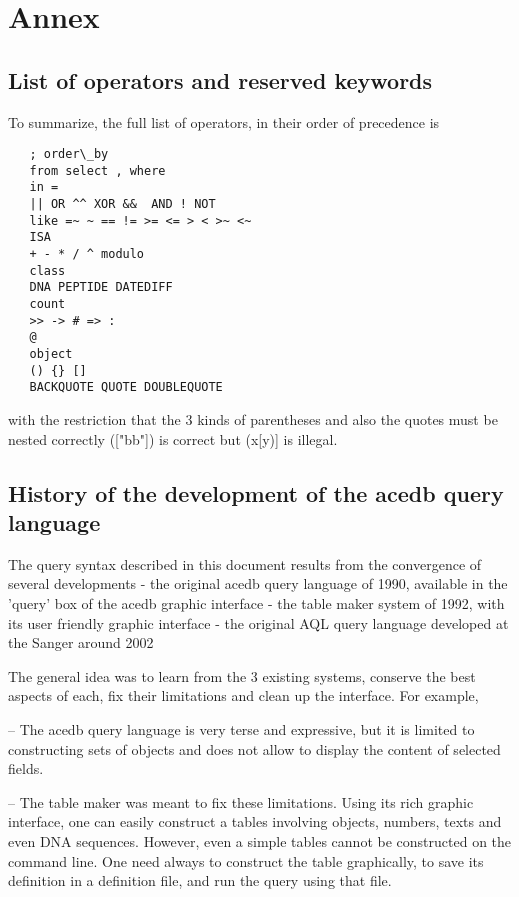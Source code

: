 \documentclass[11pt]{article}
\newcommand{\BL}{\begin{lstlisting}}
\begin{document}
%%%%%%%%%%%%%%%%%%%%%%%%%%%%%%%%%%%%%%%%%%%%%%%%%%%%%%%%%%%%%%%%
% SECTION
%%%%%%%%%%%%%%%%%%%%%%%%%%%%%%%%%%%%%%%%%%%%%%%%%%%%%%%%%%%%%%%%
\appendix
\section {Annex}
%%%%%%%%%%%%%%%%%%%%%%%%%%%%%%%%%%%%%%%%%%%%%%%%%%%%%%%%%%%%%%%%
% SECTION
%%%%%%%%%%%%%%%%%%%%%%%%%%%%%%%%%%%%%%%%%%%%%%%%%%%%%%%%%%%%%%%%
\subsection{List of operators and reserved keywords}

To summarize, the full list of operators, in their order of precedence is
\BL
   ; order\_by
   from select , where
   in = 
   || OR ^^ XOR &&  AND ! NOT
   like =~ ~ == != >= <= > < >~ <~
   ISA
   + - * / ^ modulo
   class
   DNA PEPTIDE DATEDIFF 
   count
   >> -> # => :
   @
   object
   () {} []
   BACKQUOTE QUOTE DOUBLEQUOTE 
\end{lstlisting}

with the restriction that the 3 kinds of parentheses and 
also the quotes must be nested correctly  (["bb"]) is correct but (x[y)] is illegal.

\subsection{History of the development of the acedb query language}

The query syntax described in this document results from the convergence of several developments
   - the original acedb query language of 1990, available in the 'query' box of the acedb graphic interface
   - the table maker system of 1992, with its user friendly graphic interface 
   - the original AQL query language developed at the Sanger around 2002

The general idea was to learn from the 3 existing systems, conserve the best aspects of each, fix their limitations and clean up the interface. For example, 

-- The acedb query language is very terse and expressive, but it is limited to constructing sets of objects and does not allow to display the content of selected fields.

-- The table maker was meant to fix these limitations. Using its rich graphic interface, one can easily construct a tables involving objects, numbers, texts and even DNA sequences. However, even a simple tables cannot be constructed on the command line. One need always to construct the table graphically, to save its definition in a definition file, and run the query using that file. 
\end{document}

